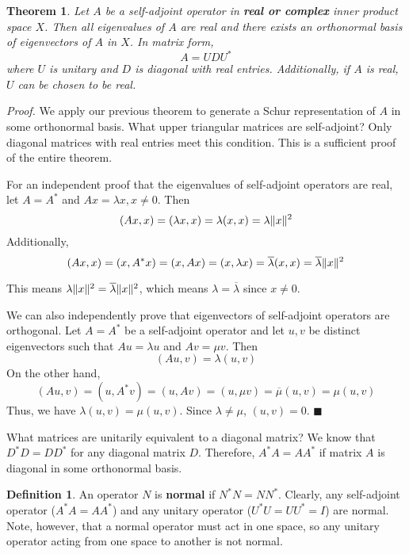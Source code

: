 \documentclass[a4paper,10pt]{book}
\theoremstyle{plain}
\newtheorem{theorem}{Theorem}[section]
\renewenvironment{proof}{\textsl{Proof.}}{\hfill$\blacksquare$}
\theoremstyle{plain}
\theoremstyle{definition}
\newtheorem{definition}{Definition}[section]
\begin{document}
\begin{theorem}
Let $A$ be a self-adjoint operator in \textbf{real or complex} inner product space $X$. Then all eigenvalues of $A$ are real and there exists an orthonormal basis of eigenvectors of $A$ in $X$. In matrix form, 
$$A = UDU^{*}$$
where $U$ is unitary and $D$ is diagonal with real entries. Additionally, if $A$ is real, $U$ can be chosen to be real. 
\end{theorem}

\begin{proof}
We apply our previous theorem to generate a Schur representation of $A$ in some orthonormal basis. What upper triangular matrices are self-adjoint? Only diagonal matrices with real entries meet this condition. This is a sufficient proof of the entire theorem. 

For an independent proof that the eigenvalues of self-adjoint operators are real, let $A = A^{*}$ and $Ax = \lambda x, x \neq 0$. Then 
$$(Ax, x) = (\lambda x, x) = \lambda (x, x) = \lambda \lVert x\rVert^{2}$$
Additionally, 
$$(Ax, x) = (x, A^{*}x) = (x, Ax) = (x, \lambda x) = \overline{\lambda} (x, x) = \overline{\lambda} \lVert x\rVert^{2}$$

This means $\lambda \lVert x\rVert^{2} = \overline{\lambda} \lVert x\rVert^{2}$, which means $\lambda = \overline{\lambda}$ since $x \neq 0$. 

We can also independently prove that eigenvectors of self-adjoint operators are orthogonal. Let $A = A^{*}$ be a self-adjoint operator and let $u, v$ be distinct eigenvectors such that $Au = \lambda u$ and $Av = \mu v$. Then 
$$(Au, v) = \lambda (u, v)$$ 
On the other hand, 
$$(Au, v) = (u, A^{*} v) = (u, Av) = (u, \mu v) = \overline{\mu} (u, v) = \mu (u, v)$$
Thus, we have $\lambda (u, v) = \mu (u, v)$. Since $\lambda \neq \mu$, $(u, v) = 0$. 
\end{proof}

What matrices are unitarily equivalent to a diagonal matrix? We know that $D^{*} D = DD^{*}$ for any diagonal matrix $D$. Therefore, $A^{*} A = AA^{*}$ if matrix $A$ is diagonal in some orthonormal basis. 

\begin{definition}
An operator $N$ is \textbf{normal} if $N^{*}N = NN^{*}$. Clearly, any self-adjoint operator ($A^{*}A = AA^{*}$) and any unitary operator ($U^{*}U = UU^{*} = I$) are normal. Note, however, that a normal operator must act in one space, so any unitary operator acting from one space to another is not normal. 
\end{definition}
\end{document}
